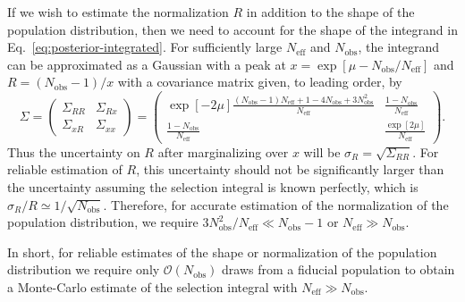 \documentclass[modern]{aastex62}
\newcommand{\Neff}{N_\mathrm{eff}}
\newcommand{\Nobs}{N_\mathrm{obs}}
\begin{document}
If we wish to estimate the normalization $R$ in addition to the shape of the
population distribution, then we need to account for the shape of the integrand
in Eq.\ \eqref{eq:posterior-integrated}.  For sufficiently large $\Neff$ and
$\Nobs$, the integrand can be approximated as a Gaussian with a peak at $x =
\exp\left[ \mu - \Nobs/\Neff \right]$ and $R = \left( \Nobs - 1 \right)/x$ with
a covariance matrix given, to leading order, by
%
\begin{equation}
  \Sigma = \begin{pmatrix} \Sigma_{RR} & \Sigma_{Rx} \\ \Sigma_{xR} & \Sigma_{xx} \end{pmatrix} = \begin{pmatrix} \exp\left[ - 2 \mu \right] \frac{\left(\Nobs - 1 \right)\Neff + 1 - 4 \Nobs + 3 \Nobs^2}{\Neff} & \frac{1 - \Nobs}{\Neff} \\ \frac{1-\Nobs}{\Neff} & \frac{\exp\left[ 2 \mu \right]}{\Neff} \end{pmatrix}.
\end{equation}
%
Thus the uncertainty on $R$ after marginalizing over $x$ will be $\sigma_R =
\sqrt{\Sigma_{RR}}$.  For reliable estimation of $R$, this uncertainty should
not be significantly larger than the uncertainty assuming the selection integral
is known perfectly, which is $\sigma_R / R \simeq 1/\sqrt{\Nobs}$.  Therefore,
for accurate estimation of the normalization of the population distribution, we
require $3\Nobs^2/\Neff \ll \Nobs - 1$ or $\Neff \gg \Nobs$.

In short, for reliable estimates of the shape or normalization of the population
distribution we require only $\mathcal{O}\left( \Nobs \right)$ draws from a
fiducial population to obtain a Monte-Carlo estimate of the selection integral
with $\Neff \gg \Nobs$.


\end{document}
